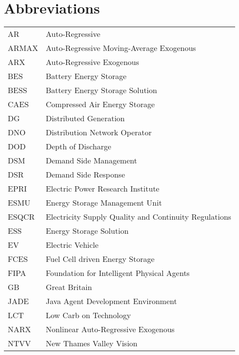 \chapter*{Abbreviations}
\begin{table*}[hbt]
  \begin{tabular}{l l}
    AR & Auto-Regressive\\
    ARMAX & Auto-Regressive Moving-Average Exogenous\\
    ARX & Auto-Regressive Exogenous\\
    BES & Battery Energy Storage\\
    BESS & Battery Energy Storage Solution\\
    CAES & Compressed Air Energy Storage\\
    DG & Distributed Generation\\
    DNO & Distribution Network Operator\\
    DOD & Depth of Discharge\\
    DSM & Demand Side Management\\
    DSR & Demand Side Response\\
    EPRI & Electric Power Research Institute\\
    ESMU & Energy Storage Management Unit\\
    ESQCR & Electricity Supply Quality and Continuity Regulations\\
    ESS & Energy Storage Solution\\
    EV & Electric Vehicle\\
    FCES & Fuel Cell driven Energy Storage\\
    FIPA & Foundation for Intelligent Physical Agents\\
    GB & Great Britain\\
    JADE & Java Agent Development Environment\\
    LCT & Low Carb on Technology\\
    NARX & Nonlinear Auto-Regressive Exogenous\\
    NTVV & New Thames Valley Vision\\    
  \end{tabular}
\end{table*}

